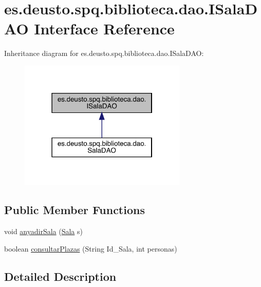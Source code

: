 \hypertarget{interfacees_1_1deusto_1_1spq_1_1biblioteca_1_1dao_1_1_i_sala_d_a_o}{}\section{es.\+deusto.\+spq.\+biblioteca.\+dao.\+I\+Sala\+D\+AO Interface Reference}
\label{interfacees_1_1deusto_1_1spq_1_1biblioteca_1_1dao_1_1_i_sala_d_a_o}


Inheritance diagram for es.\+deusto.\+spq.\+biblioteca.\+dao.\+I\+Sala\+D\+AO\+:
\nopagebreak
\begin{figure}[H]
\begin{center}
\leavevmode
\includegraphics[width=226pt]{interfacees_1_1deusto_1_1spq_1_1biblioteca_1_1dao_1_1_i_sala_d_a_o__inherit__graph}
\end{center}
\end{figure}
\subsection*{Public Member Functions}
\begin{DoxyCompactItemize}
\item 
void \mbox{\hyperlink{interfacees_1_1deusto_1_1spq_1_1biblioteca_1_1dao_1_1_i_sala_d_a_o_a20257b6e5501dd812441aa6795fcd24a}{anyadir\+Sala}} (\mbox{\hyperlink{classes_1_1deusto_1_1spq_1_1biblioteca_1_1data_1_1_sala}{Sala}} s)
\item 
boolean \mbox{\hyperlink{interfacees_1_1deusto_1_1spq_1_1biblioteca_1_1dao_1_1_i_sala_d_a_o_af12c5fe6a1abe11bc65e1118d991f926}{consultar\+Plazas}} (String Id\+\_\+\+Sala, int personas)
\end{DoxyCompactItemize}


\subsection{Detailed Description}


